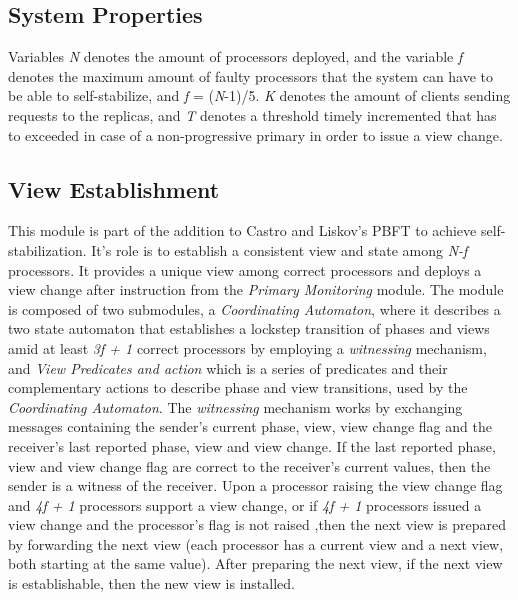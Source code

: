 \documentclass[12pt,a4paper]{report}
\begin{document}
			\subsection{System Properties}
			    Variables \textit{N} denotes the amount of processors deployed, and the variable \textit{f} denotes the maximum amount of faulty processors that the system can have to be able to self-stabilize, and \textit{f} = (\textit{N}-1)/5. \textit{K} denotes the amount of clients sending requests to the replicas, and \textit{T} denotes a threshold timely incremented that has to exceeded in case of a non-progressive primary in order to issue a view change.
			    
			\subsection{View Establishment}
			    This module is part of the addition to Castro and Liskov's PBFT \cite{pbft} to achieve self-stabilization. It's role is to establish a consistent view and state among \textit{N-f} processors. It provides a unique view among correct processors and deploys a view change after instruction from the \textit{Primary Monitoring} module. The module is composed of two submodules, a \textit{Coordinating Automaton}, where it describes a two state automaton that establishes a lockstep transition of phases and views amid at least \textit{3f + 1} correct processors by employing a \textit{witnessing} mechanism, and \textit{View Predicates and action} which is a series of predicates and their complementary actions to describe phase and view transitions, used by the \textit{Coordinating Automaton}. The \textit{witnessing} mechanism works by exchanging messages containing the sender's current phase, view, view change flag and the receiver's last reported phase, view and view change. If the last reported phase, view and view change flag are correct to the receiver's current values, then the sender is a witness of the receiver. Upon a processor raising the view change flag and \textit{4f + 1} processors support a view change, or if \textit{4f + 1} processors issued a view change and the processor's flag is not raised ,then the next view is prepared by forwarding the next view (each processor has a current view and a next view, both starting at the same value). After preparing the next view, if the next view is establishable, then the new view is installed.
			    		
\end{document}
